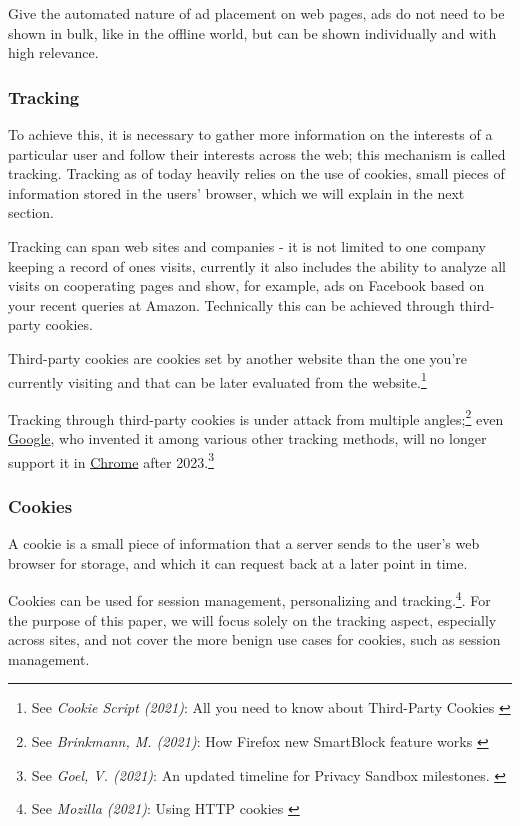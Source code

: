 Give the automated nature of ad placement on web pages, ads do not need to be shown in bulk, like in the offline world, but can be shown individually and with high relevance.

\subsubsection{Tracking}

To achieve this, it is necessary to gather more information on the interests of a particular user and follow their interests across the web; this mechanism is called tracking. Tracking as of today heavily relies on the use of cookies, small pieces of information stored in the users' browser, which we will explain in the next section.

Tracking can span web sites and companies - it is not limited to one company keeping a record of ones visits, currently it also includes the ability to analyze all visits on cooperating pages and show, for example, ads on Facebook based on your recent queries at Amazon. Technically this can be achieved through third-party cookies.

Third-party cookies are cookies set by another website than the one you're currently visiting and that can be later evaluated from the website.\footnote{See \textit{Cookie Script (2021)}: All you need to know about Third-Party Cookies \cite{mozillaBlog}}

Tracking through third-party cookies is under attack from multiple angles;\footnote{See \textit{Brinkmann, M. (2021)}: How Firefox new SmartBlock feature works \cite{mozillaBlog}} even \href{https://www.google.com/}{Google}, who invented it among various other tracking methods, will no longer support it in \href{https://www.google.com/chrome/}{Chrome} after 2023.\footnote{See \textit{Goel, V. (2021)}: An updated timeline for Privacy Sandbox milestones. \cite{sandboxDelay}}

\subsubsection{Cookies}

A cookie is a small piece of information that a server sends to the user's web browser for storage, and which it can request back at a later point in time.

Cookies can be used for session management, personalizing and tracking.\footnote{See \textit{Mozilla (2021)}: Using HTTP cookies \cite{usingCookies}}. For the purpose of this paper, we will focus solely on the tracking aspect, especially across sites, and not cover the more benign use cases for cookies, such as session management.

